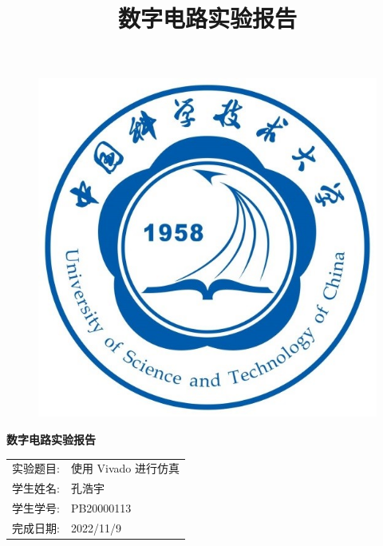 \documentclass{article}
\title{\heiti 数字电路实验报告 }
\begin{document}
	\vspace*{1cm}
	
	\begin{figure}[h]
		\centering
		\includegraphics[scale=1.0]{xh.jpg}
	\end{figure}

	\vspace*{0.5cm}
	
	\begin{center}
		\Huge{\textbf{数字电路实验报告}}
	\end{center}
	
	\vspace{5cm}
	
	\begin{table}[h]
		\centering
		\begin{Large}
			\begin{tabular}{p{3cm} p{7cm}<{\centering}}
				实验题目: &  使用 Vivado 进行仿真     \\ \cline{2-2}
				学生姓名:      & 孔浩宇   \\ \cline{2-2}
				学生学号: & PB20000113 \\ \cline{2-2}
				完成日期:       & 2022/11/9 \\ \cline{2-2}
			\end{tabular}
		\end{Large}		
	\end{table}
	\newpage
\end{document}
